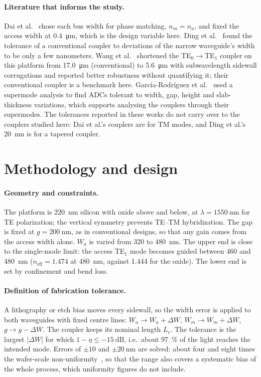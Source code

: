 \documentclass[11pt,a4paper]{article}
\newcommand{\TE}[1]{TE$_{#1}$}
\begin{document}
\paragraph{Literature that informs the study.}
Dai et al.~\citep{dai2013mode} chose each bus width for phase matching, $n_m = n_a$, and
fixed the access width at \qty{0.4}{\um}, which is the design variable here. Ding et
al.~\citep{ding2013twomode} found the tolerance of a conventional coupler to deviations
of the narrow waveguide's width to be only a few nanometers. Wang et
al.~\citep{wang2022corrugated} shortened the \TE{0}$\to$\TE{1} coupler on this platform
from \qty{17.0}{\um} (conventional) to \qty{5.6}{\um} with subwavelength sidewall
corrugations and reported better robustness without quantifying it; their conventional
coupler is a benchmark here. García-Rodríguez et al.~\citep{garcia2018tolerant} used a
supermode analysis to find ADCs tolerant to width, gap, height and slab-thickness
variations, which supports analysing the couplers through their supermodes. The
tolerances reported in these works do not carry over to the couplers studied here: Dai et
al.'s couplers are for TM modes, and Ding et al.'s \qty{20}{\nm} is for a tapered coupler.

\section{Methodology and design}

\paragraph{Geometry and constraints.}
The platform is \qty{220}{\nm} silicon with oxide above and below, at
$\lambda = \qty{1550}{\nm}$ for TE polarization; the vertical symmetry prevents TE--TM
hybridization. The gap is fixed at $g = \qty{200}{\nm}$, as in conventional designs, so
that any gain comes from the access width alone. $W_a$ is varied from 320 to
\qty{480}{\nm}. The upper end is close to the single-mode limit: the access \TE{1} mode
becomes guided between 460 and \qty{480}{\nm} ($n_\mathrm{eff} = 1.474$ at
\qty{480}{\nm}, against 1.444 for the oxide). The lower end is set by confinement and
bend loss.

\paragraph{Definition of fabrication tolerance.}
A lithography or etch bias moves every sidewall, so the width error is applied to both
waveguides with fixed centre lines: $W_a\to W_a+\Delta W$, $W_m\to W_m+\Delta W$,
$g\to g-\Delta W$. The coupler keeps its nominal length $L_c$. The tolerance is the
largest $|\Delta W|$ for which $1-\eta \leq \qty{-15}{\dB}$, i.e.\ about \qty{97}{\percent}
of the light reaches the intended mode. Errors of $\pm10$ and $\pm\qty{20}{\nm}$ are
solved: about four and eight times the wafer-scale non-uniformity~\citep{selvaraja2010linewidth},
so that the range also covers a systematic bias of the whole process, which uniformity
figures do not include.
\end{document}
